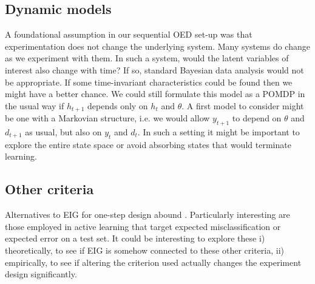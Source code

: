 \subsection{Dynamic models}
A foundational assumption in our sequential OED set-up was that experimentation does not change the underlying system. Many systems do change as we experiment with them. In such a system, would the latent variables of interest also change with time? If so, standard Bayesian data analysis would not be appropriate. If some time-invariant characteristics could be found then we might have a better chance. We could still formulate this model as a POMDP in the usual way if $h_{t+1}$ depends only on $h_t$ and $\theta$. A first model to consider might be one with a Markovian structure, i.e. we would allow $y_{t+1}$ to depend on $\theta$ and $d_{t+1}$ as usual, but also on $y_t$ and $d_t$. In such a setting it might be important to explore the entire state space or avoid absorbing states that would terminate learning.


\subsection{Other criteria}
Alternatives to EIG for one-step design abound \cite{chaloner1995}. Particularly interesting are those employed in active learning that target expected misclassification or expected error on a test set. It could be interesting to explore these i) theoretically, to see if EIG is somehow connected to these other criteria, ii) empirically, to see if altering the criterion used actually changes the experiment design significantly.

